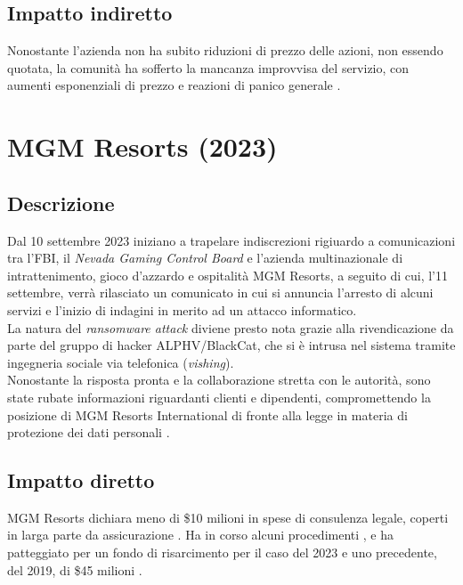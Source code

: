 \documentclass[12pt,a4paper,openright,twoside]{report}
\begin{document}
\subsection{Impatto indiretto}
Nonostante l'azienda non ha subito riduzioni di prezzo delle azioni, non essendo quotata, la comunit\`a ha sofferto la mancanza improvvisa del servizio, con aumenti esponenziali di prezzo e reazioni di panico generale \cite{ColonialPipe_context}.\\


\section{MGM Resorts (2023)}
\subsection{Descrizione}
Dal 10 settembre 2023 iniziano a trapelare indiscrezioni rigiuardo a comunicazioni tra l'FBI, il \textit{Nevada Gaming Control Board} e l'azienda multinazionale di intrattenimento, gioco d'azzardo e ospitalit\`a MGM Resorts, a seguito di cui, l'11 settembre, verr\`a rilasciato un comunicato in cui si annuncia l'arresto di alcuni servizi e l'inizio di indagini in merito ad un attacco informatico.\\
La natura del \textit{ransomware attack} diviene presto nota grazie alla rivendicazione da parte del gruppo di hacker ALPHV/BlackCat, che si \`e intrusa nel sistema tramite ingegneria sociale via telefonica (\textit{vishing}).\\
Nonostante la risposta pronta e la collaborazione stretta con le autorit\`a, sono state rubate informazioni riguardanti clienti e dipendenti, compromettendo la posizione di MGM Resorts International di fronte alla legge in materia di protezione dei dati personali \cite{MGMResorts_cybnews}.\\
\subsection{Impatto diretto}
MGM Resorts dichiara meno di \$10 milioni in spese di consulenza legale, coperti in larga parte da assicurazione \cite{MGM_8k_2023}. Ha in corso alcuni procedimenti , e ha patteggiato per un fondo di risarcimento per il caso del 2023 e uno precedente, del 2019, di \$45 milioni \cite{mgm_settlement}.  
\end{document}

